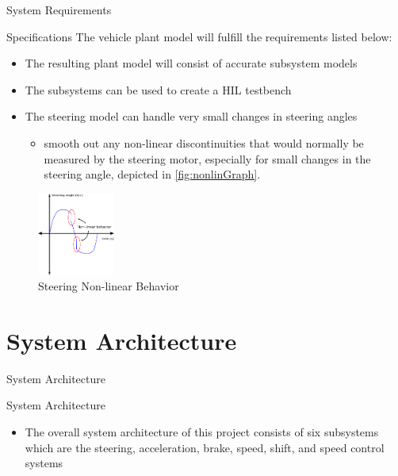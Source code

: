 \documentclass{beamer}
\begin{document}
\begin{frame}{System Requirements}
  \begin{block}{Specifications}
    The vehicle plant model will fulfill the requirements listed below:
\begin{itemize}
    \item The resulting plant model will consist of accurate subsystem models
    \item The subsystems can be used to create a HIL testbench
    \item The steering model can handle very small changes in steering angles
    \begin{itemize}
    		\item smooth out any non-linear discontinuities that would normally be measured by the steering motor, especially for small changes in the steering angle, depicted in \autoref{fig:nonlinGraph}.
    \end{itemize}
\end{itemize}
\begin{figure}[h]
    \centering
    \captionsetup{justification=centering, margin=3cm}
    \includegraphics[width=1in]{figs/inkscape/nonlinearBehavior}
    \caption{Steering Non-linear Behavior}
    \label{fig:nonlinGraph}
\end{figure}
  \end{block}
\end{frame}


\section{System Architecture}

\begin{frame}{System Architecture}
  \begin{block}{System Architecture}
 \begin{itemize}
        \item The overall system architecture of this project consists of six subsystems which are the steering, acceleration, brake, speed, shift, and speed control systems
\end{itemize}
  \end{block}
\end{frame}
\end{document}
